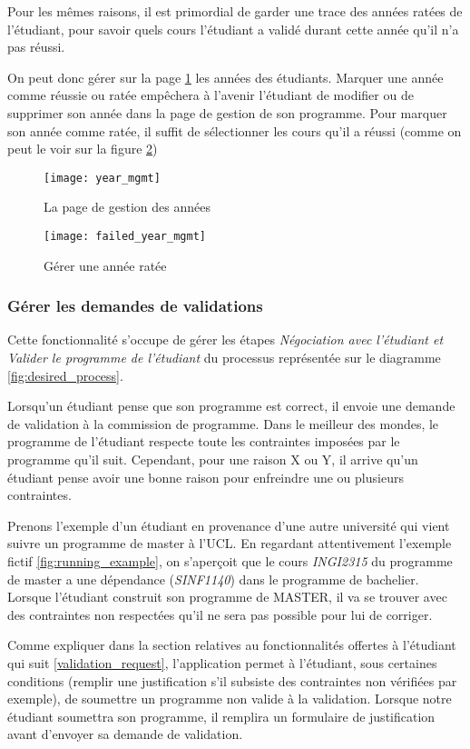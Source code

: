 Pour les mêmes raisons, il est primordial de garder une trace des années ratées de l'étudiant, pour savoir quels cours l'étudiant a validé durant cette année qu'il n'a pas réussi.

On peut donc gérer sur la page \ref{fig:year_mgmt} les années des étudiants. Marquer une année comme réussie ou ratée empêchera à l'avenir l'étudiant de modifier ou de supprimer son année dans la page de gestion de son programme. Pour marquer son année comme ratée, il suffit de sélectionner les cours qu'il a réussi (comme on peut le voir sur la figure \ref{fig:failed_year_mgmt})
\begin{figure}
\centering
\caption{La page de gestion des années}
\label{fig:year_mgmt}
\texttt{[image: year\_mgmt]}
\end{figure}

\begin{figure}
\centering
\caption{Gérer une année ratée}
\label{fig:failed_year_mgmt}
\texttt{[image: failed\_year\_mgmt]}
\end{figure}


\subsubsection{Gérer les demandes de validations}
Cette fonctionnalité s'occupe de gérer les étapes \textit{Négociation avec l'étudiant et Valider le programme de l'étudiant} du processus représentée sur le diagramme \ref{fig:desired_process}. 

Lorsqu'un étudiant pense que son programme est correct, il envoie une demande de validation à la commission de programme. Dans le meilleur des mondes, le programme de l'étudiant respecte toute les contraintes imposées par le programme qu'il suit. Cependant, pour une raison X ou Y, il arrive qu'un étudiant pense avoir une bonne raison pour enfreindre une ou plusieurs contraintes.

Prenons l'exemple d'un étudiant en provenance d'une autre université qui vient suivre un programme de master à l'UCL. En regardant attentivement l'exemple fictif \ref{fig:running_example}, on s’aperçoit que le cours \textit{INGI2315} du programme de master a une dépendance (\textit{SINF1140}) dans le programme de bachelier. Lorsque l'étudiant construit son programme de MASTER, il va se trouver avec des contraintes non respectées qu'il ne sera pas possible pour lui de corriger. 

Comme expliquer dans la section relatives au fonctionnalités offertes à l'étudiant qui suit \ref{validation_request}, l'application permet à l'étudiant, sous certaines conditions (remplir une justification s'il subsiste des contraintes non vérifiées par exemple), de soumettre un programme non valide à la validation. Lorsque notre étudiant soumettra son programme, il remplira un formulaire de justification avant d'envoyer sa demande de validation.


